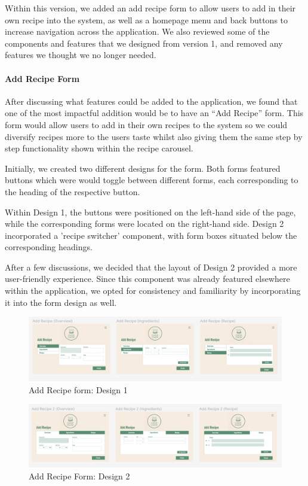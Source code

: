 \documentclass{article}
\begin{document}
Within this version, we added an add recipe form to allow users to add in their own recipe into the system, as well as a homepage menu and back buttons to increase navigation across the application. We also reviewed some of the components and features that we designed from version 1, and removed any features we thought we no longer needed.

\paragraph{Add Recipe Form}
After discussing what features could be added to the application, we found that one of the most impactful addition would be to have an “Add Recipe” form. This form would allow users to add in their own recipes to the system so we could diversify recipes more to the users taste whilst also giving them the same step by step functionality shown within the recipe carousel.

Initially, we created two different designs for the form. Both forms featured buttons which were would toggle between different forms, each corresponding to the heading of the respective button.

Within Design 1, the buttons were positioned on the left-hand side of the page, while the corresponding forms were located on the right-hand side. Design 2 incorporated a 'recipe switcher' component, with form boxes situated below the corresponding headings.

After a few discussions, we decided that the layout of Design 2 provided a more user-friendly experience. Since this component was already featured elsewhere within the application, we opted for consistency and familiarity by incorporating it into the form design as well.

\begin{figure}[h]
  \includegraphics[width=1.0\textwidth]{assets/design-images/Design 1 Add Recipe Form.png}
  \centering
  \caption{Add Recipe form: Design 1 }
\end{figure}

\begin{figure}[h]
  \includegraphics[width=1.0\textwidth]{assets/design-images/Design 2 Add Recipe Form.png}
  \centering
  \caption{Add Recipe Form: Design 2}
\end{figure}
\end{document}
